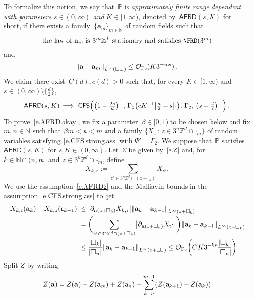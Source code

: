 \documentclass[11pt]{article} %
\let\oldsquare\square %
\renewcommand{\square}{\oldsquare}
\numberwithin{equation}{section}
\theoremstyle{definition}
\let\originalleft\left
\let\originalright\right
\renewcommand{\left}{\mathopen{}\mathclose\bgroup\originalleft}
\renewcommand{\right}{\aftergroup\egroup\originalright}
\newcommand*{\N}{\ensuremath{\mathbb{N}}}
\newcommand*{\Zd}{\ensuremath{\mathbb{Z}^d}}
\renewcommand{\a}{\mathbf{a}}
\newcommand{\cu}{\square}
\renewcommand{\P}{\mathbb{P}}
\renewcommand{\O}{\mathcal{O}}
\newcommand{\CFS}{\mathsf{CFS}}
\newcommand{\AFRD}{\mathsf{AFRD}}
\begin{document}
To formalize this notion, 
we say that~$\P$ is \emph{approximately finite range dependent with parameters $s \in (0,\infty)$ and $K \in [1,\infty)$}, denoted by~$\AFRD(s,K)$ for short, if there exists a family~$\{ \a_m\}_{m\in\N}$ of random fields such that 
\begin{align}
\label{e.AFRD1}
\text{the law of~$\a_m$ is $3^m\Zd$--stationary and  satisfies $\FRD(3^m)$} 
\end{align}
and
\begin{align}
\label{e.AFRD2}
\left\| \a - \a_m \right\|_{L^\infty(\cu_m)} 
\leq 
\O_{\Gamma_2}(K3^{-ms})
\,.
\end{align}
We claim there exist~$C(d),c(d)>0$ such that, for every $K \in [1,\infty)$ and $s \in (0,\infty) \setminus \{ \tfrac d2 \}$, 
\begin{equation}
\label{e.AFRD.okay}
\AFRD\left(s,K \right) \implies
\CFS \Bigl(  
\bigl( 1 - \tfrac {2s}{d} \bigr)_+ , \,
\Gamma_2 \bigl( cK^{-1} \bigl| \tfrac d2-s\bigr| \cdot \bigr), \,
\Gamma_2, \, 
\bigl( s - \tfrac d2 \bigr)_+
\Bigr)\,.
\end{equation}
To prove~\eqref{e.AFRD.okay}, 
we fix a parameter~$\beta \in [0,1)$ to be chosen below and fix $m,n\in\N$ such that~$\beta m < n < m$ and a family $\{ X_z \,:\, z\in 3^n\Zd\cap \cu_m\}$ of random variables satisfying~\eqref{e.CFS.strong.ass} with $\Psi'=\Gamma_2$.
We suppose that~$\P$ satisfies~$\AFRD(s,K)$ for $s,K\in(0,\infty)$. 
Let~$Z$ be given by~\eqref{e.Z} and, 
for~$k \in\N \cap (n,m]$ and~$z\in 3^k\Zd\cap\cu_m$, define
\begin{equation*}
X_{k,z}:= 
\sum_{z' \in 3^n\Zd \cap (z+\cu_k)} 
X_{z'}. 
\end{equation*}
We use the assumption~\eqref{e.AFRD2} and the Malliavin bounds in the assumption~\eqref{e.CFS.strong.ass} to get 
\begin{align*}
\left| X_{k,z} (\a_k) - X_{k,z}(\a_{k-1}) \right|
&
\leq 
\left| \partial_{\a(z+\cu_k)} X_{k,z} \right| 
\left\| {\a}_k - {\a}_{k-1}  \right\|_{L^\infty(z+\cu_k)}
\\ & 
=
\biggl( \sum_{z' \in 3^n\Zd \cap (z+\cu_k)} 
\left| \partial_{\a(z+\cu_k)} 
X_{z'} \right| 
\biggr)
\left\| {\a}_k - {\a}_{k-1}  \right\|_{L^\infty(z+\cu_k)}
\\ & 
\leq
\frac{|\cu_k|}{|\cu_n|} \left\| {\a}_k - {\a}_{k-1}  \right\|_{L^\infty(z+\cu_k)}
\leq 
\O_{\Gamma_2} 
\left(CK3^{-ks} \frac{|\cu_k|}{|\cu_n|}\right)
\,.
\end{align*}
Split $Z$ by writing
\begin{equation*}
Z(\a) 
=
Z(\a) - Z({\a}_m) + Z({\a}_n) + \sum_{k=n}^{m-1} \left( Z({\a}_{k+1}) - Z({\a}_k) \right)
\end{equation*}
\end{document}

